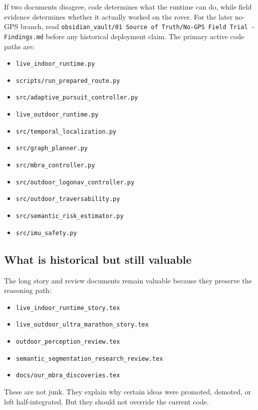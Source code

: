 \documentclass[11pt]{article}
\begin{document}
If two documents disagree, code determines what the runtime can do, while field
evidence determines whether it actually worked on the rover. For the later
no-GPS branch, read
\texttt{obsidian\_vault/01 Source of Truth/No-GPS Field Trial - Findings.md}
before any historical deployment claim. The primary active code paths are:

\begin{itemize}[nosep]
  \item \texttt{live\_indoor\_runtime.py}
  \item \texttt{scripts/run\_prepared\_route.py}
  \item \texttt{src/adaptive\_pursuit\_controller.py}
  \item \texttt{live\_outdoor\_runtime.py}
  \item \texttt{src/temporal\_localization.py}
  \item \texttt{src/graph\_planner.py}
  \item \texttt{src/mbra\_controller.py}
  \item \texttt{src/outdoor\_logonav\_controller.py}
  \item \texttt{src/outdoor\_traversability.py}
  \item \texttt{src/semantic\_risk\_estimator.py}
  \item \texttt{src/imu\_safety.py}
\end{itemize}

\subsection{What is historical but still valuable}

The long story and review documents remain valuable because they preserve the
reasoning path:

\begin{itemize}[nosep]
  \item \texttt{live\_indoor\_runtime\_story.tex}
  \item \texttt{live\_outdoor\_ultra\_marathon\_story.tex}
  \item \texttt{outdoor\_perception\_review.tex}
  \item \texttt{semantic\_segmentation\_research\_review.tex}
  \item \texttt{docs/our\_mbra\_discoveries.tex}
\end{itemize}

These are not junk. They explain why certain ideas were promoted, demoted, or
left half-integrated. But they should not override the current code.
\end{document}

